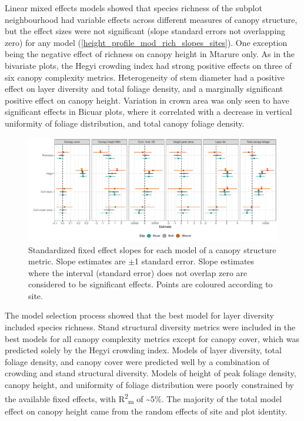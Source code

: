 \documentclass[11pt,a4paper]{article}
\begin{document}
Linear mixed effects models showed that species richness of the subplot neighbourhood had variable effects across different measures of canopy structure, but the effect sizes were not significant (slope standard errors not overlapping zero) for any model (\autoref{height_profile_mod_rich_slopes_sites}). One exception being the negative effect of richness on canopy height in Mtarure only. As in the bivariate plots, the Hegyi crowding index had strong positive effects on three of six canopy complexity metrics. Heterogeneity of stem diameter had a positive effect on layer diversity and total foliage density, and a marginally significant positive effect on canopy height. Variation in crown area was only seen to have significant effects in Bicuar plots, where it correlated with a decrease in vertical uniformity of foliage distribution, and total canopy foliage density.

\begin{figure}[H]
\centering
	\includegraphics[width=\textwidth]{height_profile_mod_rich_slopes_sites}
	\caption{Standardized fixed effect slopes for each model of a canopy structure metric. Slope estimates are $\pm$1 standard error. Slope estimates where the interval (standard error) does not overlap zero are considered to be significant effects. Points are coloured according to site.}
	\label{height_profile_mod_rich_slopes_sites}
\end{figure}

The model selection process showed that the best model for layer diversity included species richness. Stand structural diversity metrics were included in the best models for all canopy complexity metrics except for canopy cover, which was predicted solely by the Hegyi crowding index. Models of layer diversity, total foliage density, and canopy cover were predicted well by a combination of crowding and stand structural diversity. Models of height of peak foliage density, canopy height, and uniformity of foliage distribution were poorly constrained by the available fixed effects, with R\textsuperscript{2}\textsubscript{m} of \textasciitilde{}5\%. The majority of the total model effect on canopy height came from the random effects of site and plot identity.
\end{document}
